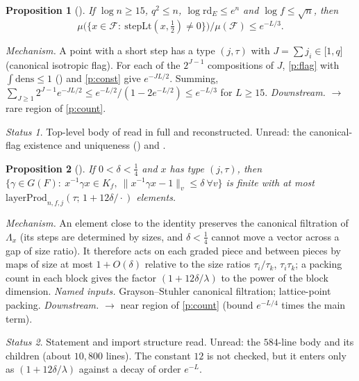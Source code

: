 \documentclass[11pt]{article}
\newcommand{\rd}{\mathrm{rd}}
\newtheorem{prop}{Proposition}
\theoremstyle{remark}
\newtheorem*{status}{Status}
\begin{document}
\begin{prop}[]\label{p:nonzero}
If $\log n\ge15$, $q^2\le n$, $\log\rd_E\le e^n$ and $\log f\le\sqrt n$, then
\[
\mu\bigl(\{x\in\mathcal F:\ \mathrm{stepLt}(x,\tfrac12)\ne0\}\bigr)/\mu(\mathcal F)\le e^{-L/3}.
\]
\end{prop}
\emph{Mechanism.} A point with a short step has a type $(j,\tau)$ with $J=\sum j_i\in\lbrack1,q\rbrack$ (canonical isotropic flag). For each of the $2^{J-1}$ compositions of $J$, \ref{p:flag} with $\int\mathrm{dens}\le1$ () and \ref{p:const} give $e^{-JL/2}$. Summing, $\sum_{J\ge1}2^{J-1}e^{-JL/2}\le e^{-L/2}/(1-2e^{-L/2})\le e^{-L/3}$ for $L\ge15$.
\emph{Downstream.}  $\to$ rare region of \ref{p:count}.
\begin{status}Top-level body of  read in full and reconstructed. Unread: the canonical-flag existence and uniqueness () and .\end{status}

\begin{prop}[]\label{p:near}
If $0<\delta<\tfrac14$ and $x$ has type $(j,\tau)$, then $\{\gamma\in G(F):\ x^{-1}\gamma x\in K_f,\ \lVert x^{-1}\gamma x-1\rVert_v\le\delta\ \forall v\}$ is finite with at most $\mathrm{layerProd}_{n,f,j}(\tau;\,1+12\delta/\cdot)$ elements.
\end{prop}
\emph{Mechanism.} An element close to the identity preserves the canonical filtration of $\Lambda_x$ (its steps are determined by sizes, and $\delta<\tfrac14$ cannot move a vector across a gap of size ratio). It therefore acts on each graded piece and between pieces by maps of size at most $1+O(\delta)$ relative to the size ratios $\tau_i/\tau_k$, $\tau_i\tau_k$; a packing count in each block gives the factor $(1+12\delta/\lambda)$ to the power of the block dimension.
\emph{Named inputs.} Grayson--Stuhler canonical filtration; lattice-point packing.
\emph{Downstream.}  $\to$ near region of \ref{p:count} (bound $e^{-L/4}$ times the main term).
\begin{status}Statement and import structure read. Unread: the $584$-line  body and its children (about $10{,}800$ lines). The constant $12$ is not checked, but it enters only as $(1+12\delta/\lambda)$ against a decay of order $e^{-L}$.\end{status}
\end{document}
